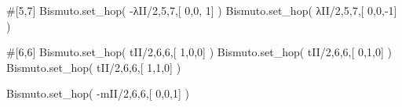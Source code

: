 \documentclass[
  letterpaper,
  DIV=11,
  numbers=noendperiod]{scrreprt}
\newenvironment{Shaded}{\begin{snugshade}}{\end{snugshade}}
\newcommand{\CommentTok}[1]{\textcolor[rgb]{0.37,0.37,0.37}{#1}}
\newcommand{\DecValTok}[1]{\textcolor[rgb]{0.68,0.00,0.00}{#1}}
\newcommand{\NormalTok}[1]{\textcolor[rgb]{0.00,0.23,0.31}{#1}}
\newcommand{\OperatorTok}[1]{\textcolor[rgb]{0.37,0.37,0.37}{#1}}
\begin{document}
\begin{Shaded}
\begin{Highlighting}[]
\CommentTok{\#[5,7]}
\NormalTok{Bismuto.set\_hop( }\OperatorTok{{-}}\NormalTok{λII}\OperatorTok{/}\DecValTok{2}\NormalTok{,}\DecValTok{5}\NormalTok{,}\DecValTok{7}\NormalTok{,[ }\DecValTok{0}\NormalTok{,}\DecValTok{0}\NormalTok{, }\DecValTok{1}\NormalTok{] ) }
\NormalTok{Bismuto.set\_hop(  λII}\OperatorTok{/}\DecValTok{2}\NormalTok{,}\DecValTok{5}\NormalTok{,}\DecValTok{7}\NormalTok{,[ }\DecValTok{0}\NormalTok{,}\DecValTok{0}\NormalTok{,}\OperatorTok{{-}}\DecValTok{1}\NormalTok{] ) }
\end{Highlighting}
\end{Shaded}

\begin{Shaded}
\begin{Highlighting}[]
\CommentTok{\#[6,6]}
\NormalTok{Bismuto.set\_hop(  tII}\OperatorTok{/}\DecValTok{2}\NormalTok{,}\DecValTok{6}\NormalTok{,}\DecValTok{6}\NormalTok{,[ }\DecValTok{1}\NormalTok{,}\DecValTok{0}\NormalTok{,}\DecValTok{0}\NormalTok{] ) }
\NormalTok{Bismuto.set\_hop(  tII}\OperatorTok{/}\DecValTok{2}\NormalTok{,}\DecValTok{6}\NormalTok{,}\DecValTok{6}\NormalTok{,[ }\DecValTok{0}\NormalTok{,}\DecValTok{1}\NormalTok{,}\DecValTok{0}\NormalTok{] ) }
\NormalTok{Bismuto.set\_hop(  tII}\OperatorTok{/}\DecValTok{2}\NormalTok{,}\DecValTok{6}\NormalTok{,}\DecValTok{6}\NormalTok{,[ }\DecValTok{1}\NormalTok{,}\DecValTok{1}\NormalTok{,}\DecValTok{0}\NormalTok{] ) }
 
\NormalTok{Bismuto.set\_hop( }\OperatorTok{{-}}\NormalTok{mII}\OperatorTok{/}\DecValTok{2}\NormalTok{,}\DecValTok{6}\NormalTok{,}\DecValTok{6}\NormalTok{,[ }\DecValTok{0}\NormalTok{,}\DecValTok{0}\NormalTok{,}\DecValTok{1}\NormalTok{] ) }
\end{Highlighting}
\end{Shaded}
\end{document}
